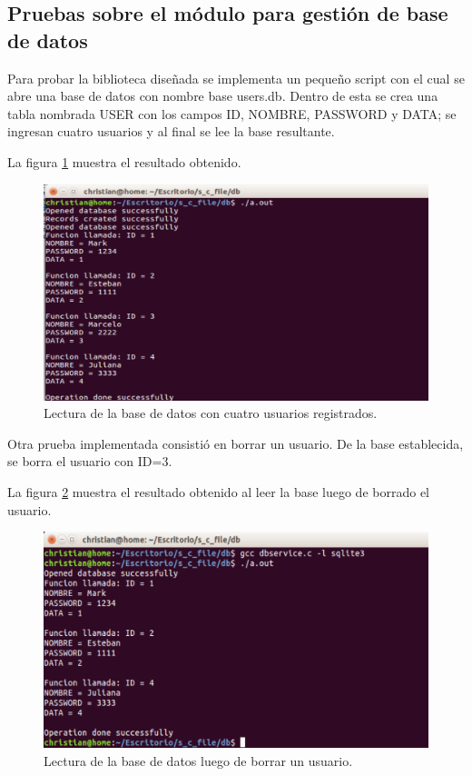 \subsection{Pruebas sobre el módulo para gestión de base de datos}
Para probar la biblioteca diseñada se implementa un pequeño script con el cual se abre una base de datos con nombre base users.db. Dentro de esta se crea una tabla nombrada USER con los campos ID, NOMBRE, PASSWORD y DATA; se ingresan cuatro usuarios y al final se lee la base resultante.

La figura \ref{fig:baseuno} muestra el resultado obtenido.

\begin{figure}[h]
	\centering
	\includegraphics[scale=.3]{./Figures/baseuno.png}
	\caption{Lectura de la base de datos con cuatro usuarios registrados.}
	\label{fig:baseuno}
\end{figure}

Otra prueba implementada consistió en borrar un usuario. De la base establecida, se borra el usuario con ID=3.

La figura \ref{fig:basedos} muestra el resultado obtenido al leer la base luego de borrado el usuario.

\begin{figure}[H]
	\centering
	\includegraphics[scale=.3]{./Figures/basedos.png}
	\caption{Lectura de la base de datos luego de borrar un usuario.}
	\label{fig:basedos}
\end{figure}

